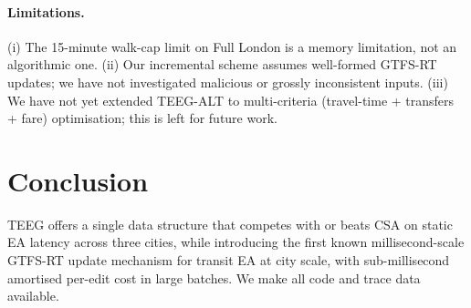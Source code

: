 \documentclass[letterpaper]{article}
\theoremstyle{definition}
\theoremstyle{plain}
\begin{document}
\paragraph{Limitations.}
(i) The 15-minute walk-cap limit on Full London is a memory limitation, not
an algorithmic one. (ii) Our incremental scheme assumes well-formed
GTFS-RT updates; we have not investigated malicious or grossly inconsistent
inputs. (iii) We have not yet extended TEEG-ALT to multi-criteria
(travel-time + transfers + fare) optimisation; this is left for future
work.

\section{Conclusion}

TEEG offers a single data structure that competes with or beats CSA on
static EA latency across three cities, while introducing the first known
millisecond-scale GTFS-RT update mechanism for transit EA at city scale,
with sub-millisecond amortised per-edit cost in large batches.
We make all code and trace data available.


\end{document}
